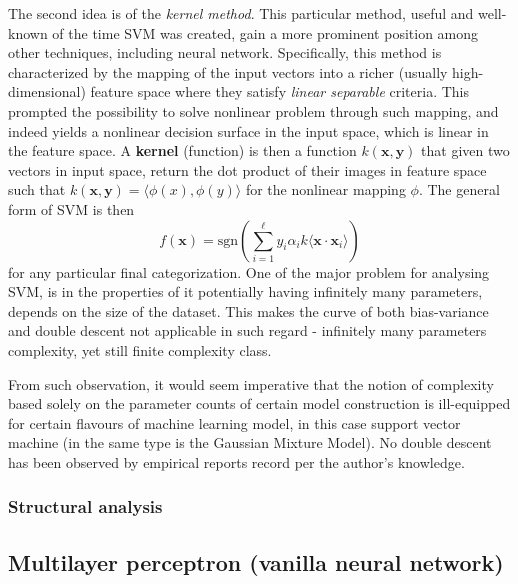 The second idea is of the \textit{kernel method}. This particular method, useful and well-known of the time SVM was created, gain a more prominent position among other techniques, including neural network. Specifically, this method is characterized by the mapping of the input vectors into a richer (usually high-dimensional) feature space where they satisfy \textit{linear separable} criteria. This prompted the possibility to solve nonlinear problem through such mapping, and indeed yields a nonlinear decision surface in the input space, which is linear in the feature space. A \textbf{kernel} (function) is then a function $k(\mathbf{x},\mathbf{y})$ that given two vectors in input space, return the dot product of their images in feature space such that $k(\mathbf{x},\mathbf{y})=\langle \phi(x), \phi(y) \rangle$ for the nonlinear mapping $\phi$. The general form of SVM is then 
\begin{equation}
    f(\mathbf{x}) = \mathrm{sgn} \left(\sum^{\ell}_{i=1} y_{i}\alpha_{i}k\langle \mathbf{x}\cdot \mathbf{x}_{i} \rangle\right)
\end{equation}
for any particular final categorization. One of the major problem for analysing SVM, is in the properties of it potentially having infinitely many parameters, depends on the size of the dataset. This makes the curve of both bias-variance and double descent not applicable in such regard - infinitely many parameters complexity, yet still finite complexity class. 

From such observation, it would seem imperative that the notion of complexity based solely on the parameter counts of certain model construction is ill-equipped for certain flavours of machine learning model, in this case support vector machine (in the same type is the Gaussian Mixture Model). No double descent has been observed by empirical reports record per the author's knowledge. 

\subsubsection{Structural analysis}

\clearpage

\subsection{Multilayer perceptron (vanilla neural network)}

